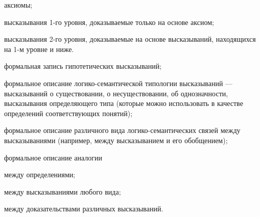 \begin{SCn}
\begin{scnsubstruct}
\begin{scnsubstruct}
{\begin{scnitemize}
                    \begin{scnitemizeii}
                        \item аксиомы;
                        \item высказывания 1-го уровня, доказываемые только на основе аксиом;
                        \item высказывания 2-го уровня, доказываемые на основе высказываний, находящихся на 1-м уровне и ниже.
                    \end{scnitemizeii}
                    \item формальная запись гипотетических высказываний;
                    \item формальное описание логико-семантической типологии высказываний --- высказываний о существовании, о несуществовании, об однозначности, высказывания определяющего типа (которые можно использовать в качестве определений соответствующих понятий);
                    \item формальное описание различного вида логико-семантических связей между высказываниями (например, между высказыванием и его обобщением);
                    \item формальное описание аналогии
                    \begin{scnitemizeii}
                        \item между определениями;
                        \item между высказываниями любого вида;
                        \item между доказательствами различных высказываний.
                    \end{scnitemizeii}
                \end{scnitemize}}
            
            

\end{scnsubstruct}
\end{scnsubstruct}
\end{SCn}
